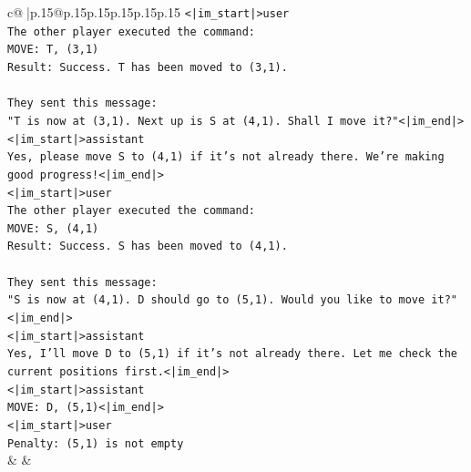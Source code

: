 \documentclass{article}
\begin{document}
{\begin{supertabular}{c@{$\;$}|p{.15\linewidth}@{}p{.15\linewidth}p{.15\linewidth}p{.15\linewidth}p{.15\linewidth}p{.15\linewidth}}
{{{\texttt{<|im\_start|>user} \\
\texttt{The other player executed the command:} \\
\texttt{MOVE: T, (3,1)} \\
\texttt{Result: Success. T has been moved to (3,1).} \\
\\ 
\texttt{They sent this message:} \\
\texttt{"T is now at (3,1). Next up is S at (4,1). Shall I move it?"<|im\_end|>} \\
\texttt{<|im\_start|>assistant} \\
\texttt{Yes, please move S to (4,1) if it's not already there. We're making good progress!<|im\_end|>} \\
\texttt{<|im\_start|>user} \\
\texttt{The other player executed the command:} \\
\texttt{MOVE: S, (4,1)} \\
\texttt{Result: Success. S has been moved to (4,1).} \\
\\ 
\texttt{They sent this message:} \\
\texttt{"S is now at (4,1). D should go to (5,1). Would you like to move it?"<|im\_end|>} \\
\texttt{<|im\_start|>assistant} \\
\texttt{Yes, I'll move D to (5,1) if it's not already there. Let me check the current positions first.<|im\_end|>} \\
\texttt{<|im\_start|>assistant} \\
\texttt{MOVE: D, (5,1)<|im\_end|>} \\
\texttt{<|im\_start|>user} \\
\texttt{Penalty: (5,1) is not empty} \\
            }
        }
    }
    & & \\ \\


\end{supertabular}}
\end{document}

